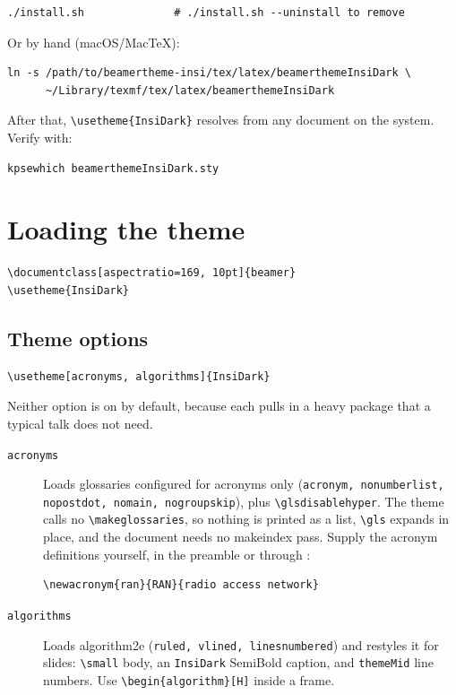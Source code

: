 \documentclass[a4paper,11pt]{article}
\begin{document}
\begin{lstlisting}
./install.sh              # ./install.sh --uninstall to remove
\end{lstlisting}

Or by hand (macOS/MacTeX):

\begin{lstlisting}
ln -s /path/to/beamertheme-insi/tex/latex/beamerthemeInsiDark \
      ~/Library/texmf/tex/latex/beamerthemeInsiDark
\end{lstlisting}

After that, \verb|\usetheme{InsiDark}| resolves from any document on the
system.  Verify with:

\begin{lstlisting}
kpsewhich beamerthemeInsiDark.sty
\end{lstlisting}

\section{Loading the theme}

\begin{lstlisting}
\documentclass[aspectratio=169, 10pt]{beamer}
\usetheme{InsiDark}
\end{lstlisting}

\subsection{Theme options}
\label{sec:options}

\begin{lstlisting}
\usetheme[acronyms, algorithms]{InsiDark}
\end{lstlisting}

Neither option is on by default, because each pulls in a heavy package that a
typical talk does not need.

\begin{description}
	\item[\texttt{acronyms}] Loads \textsf{glossaries} configured for acronyms
	      only (\texttt{acronym, nonumberlist, nopostdot, nomain, nogroupskip}),
	      plus \verb|\glsdisablehyper|.  The theme calls no
	      \verb|\makeglossaries|, so nothing is printed as a list, \verb|\gls|
	      expands in place, and the document needs no \textsf{makeindex} pass.
	      Supply the acronym definitions yourself, in the preamble or through
	      \verb||:
	      \begin{lstlisting}
\newacronym{ran}{RAN}{radio access network}
\end{lstlisting}
	\item[\texttt{algorithms}] Loads \textsf{algorithm2e}
	      (\texttt{ruled, vlined, linesnumbered}) and restyles it for slides:
	      \verb|\small| body, an \texttt{InsiDark} SemiBold caption, and
	      \texttt{themeMid} line numbers.  Use \verb|\begin{algorithm}[H]| inside
	      a frame.
\end{description}
\end{document}
